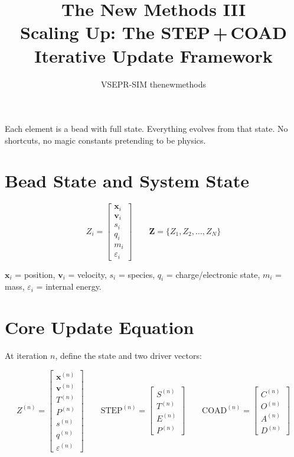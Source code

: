 \documentclass[11pt, letterpaper]{article}
\title{\textbf{The New Methods III}\\[0.4em]
\large Scaling Up: The STEP\,+\,COAD Iterative Update Framework}
\author{VSEPR-SIM thenewmethods}
\date{}
\newcommand{\STEPn}{\mathrm{STEP}^{(n)}}
\newcommand{\COADn}{\mathrm{COAD}^{(n)}}
\newcommand{\bZ}{\mathbf{Z}}
\begin{document}
\maketitle
\thispagestyle{empty}

\noindent
Each element is a bead with full state.  Everything evolves from that state.
No shortcuts, no magic constants pretending to be physics.

\section{Bead State and System State}

\[
Z_i =
\begin{bmatrix}
\mathbf{x}_i \\ \mathbf{v}_i \\ s_i \\ q_i \\ m_i \\ \varepsilon_i
\end{bmatrix}
\qquad
\bZ = \{Z_1, Z_2, \ldots, Z_N\}
\]

$\mathbf{x}_i$ = position, $\mathbf{v}_i$ = velocity, $s_i$ = species,
$q_i$ = charge/electronic state, $m_i$ = mass, $\varepsilon_i$ = internal energy.

\section{Core Update Equation}

At iteration $n$, define the state and two driver vectors:

\[
Z^{(n)} =
\begin{bmatrix}
\mathbf{x}^{(n)} \\ \mathbf{v}^{(n)} \\ T^{(n)} \\ P^{(n)} \\ s^{(n)} \\ q^{(n)} \\ \varepsilon^{(n)}
\end{bmatrix}
\qquad
\STEPn =
\begin{bmatrix} S^{(n)} \\ T^{(n)} \\ E^{(n)} \\ P^{(n)} \end{bmatrix}
\qquad
\COADn =
\begin{bmatrix} C^{(n)} \\ O^{(n)} \\ A^{(n)} \\ D^{(n)} \end{bmatrix}
\]
\end{document}
